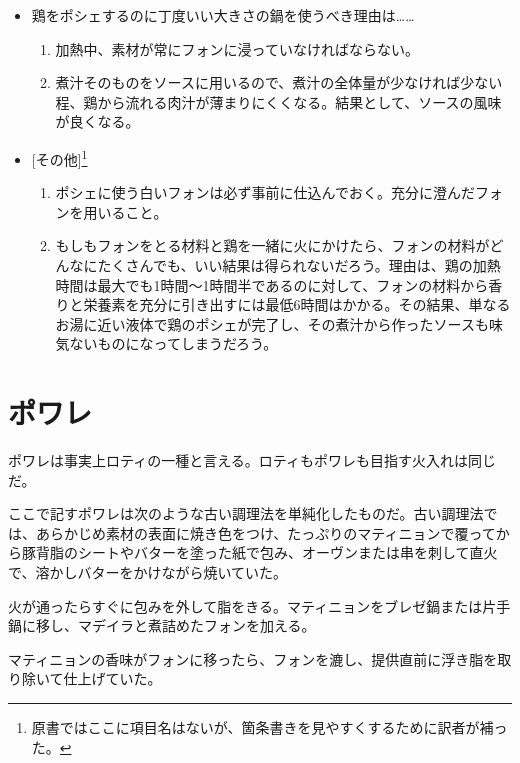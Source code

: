 \begin{itemize}
\item
  鶏をポシェするのに丁度いい大きさの鍋を使うべき理由は\ldots{}\ldots{}

  \begin{enumerate}
  \def\labelenumi{\arabic{enumi}.}
  \item
    加熱中、素材が常にフォンに浸っていなければならない。
  \item
    煮汁そのものをソースに用いるので、煮汁の全体量が少なければ少ない程、鶏から流れる肉汁が薄まりにくくなる。結果として、ソースの風味が良くなる。
  \end{enumerate}
\item
  {[}その他{]}\footnote{原書ではここに項目名はないが、箇条書きを見やすくするために訳者が補った。}　　

  \begin{enumerate}
  \def\labelenumi{\arabic{enumi}.}
  \item
    ポシェに使う白いフォンは必ず事前に仕込んでおく。充分に澄んだフォンを用いること。
  \item
    もしもフォンをとる材料と鶏を一緒に火にかけたら、フォンの材料がどんなにたくさんでも、いい結果は得られないだろう。理由は、鶏の加熱時間は最大でも1時間〜1時間半であるのに対して、フォンの材料から香りと栄養素を充分に引き出すには最低6時間はかかる。その結果、単なるお湯に近い液体で鶏のポシェが完了し、その煮汁から作ったソースも味気ないものになってしまうだろう。
  \end{enumerate}
\end{itemize}

\hypertarget{les-poeles}{%
\section{ポワレ}\label{les-poeles}}


ポワレは事実上ロティの一種と言える。ロティもポワレも目指す火入れは同じだ。

ここで記すポワレは次のような古い調理法を単純化したものだ。古い調理法では、あらかじめ素材の表面に焼き色をつけ、たっぷりのマティニョンで覆ってから豚背脂のシートやバターを塗った紙で包み、オーヴンまたは串を刺して直火で、溶かしバターをかけながら焼いていた。

火が通ったらすぐに包みを外して脂をきる。マティニョンをブレゼ鍋または片手鍋に移し、マデイラと煮詰めたフォンを加える。

マティニョンの香味がフォンに移ったら、フォンを漉し、提供直前に浮き脂を取り除いて仕上げていた。

